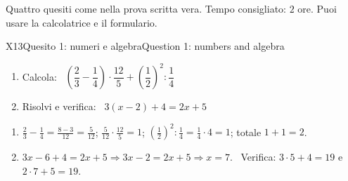 \begin{tcolorbox}[colback=lv3!5, colframe=lv3!60, boxrule=0.5pt, arc=2pt, left=6pt, right=6pt, top=3pt, bottom=3pt]
Quattro quesiti come nella prova scritta vera. Tempo consigliato: $2$ ore. Puoi usare la calcolatrice e il formulario.
\end{tcolorbox}

\begin{esercizio}{X1}{3}{Quesito 1: numeri e algebra}{Question 1: numbers and algebra}
\begin{enumerate}
\item Calcola: \ $\left(\dfrac23-\dfrac14\right)\cdot\dfrac{12}{5}+\left(\dfrac12\right)^2:\dfrac14$
\item Risolvi e verifica: \ $3(x-2)+4=2x+5$
\end{enumerate}
\end{esercizio}
\begin{solbox}
\begin{enumerate}
\item $\frac23-\frac14=\frac{8-3}{12}=\frac{5}{12}$; \quad $\frac{5}{12}\cdot\frac{12}{5}=1$; \quad $\left(\frac12\right)^2:\frac14=\frac14\cdot4=1$; \quad totale $1+1=\boxed{2}$.
\item $3x-6+4=2x+5\Rightarrow 3x-2=2x+5\Rightarrow\boxed{x=7}$. \ Verifica: $3\cdot5+4=19$ e $2\cdot7+5=19$. \checkmark
\end{enumerate}
\end{solbox}

